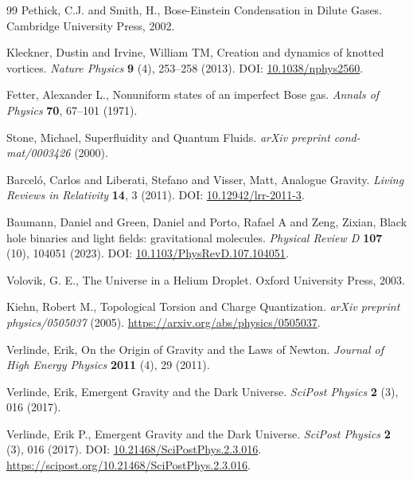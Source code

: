 \documentclass[12pt]{article}
\begin{document}
\begin{thebibliography}{99}
Pethick, C.J. and Smith, H.,
\newblock Bose-Einstein Condensation in Dilute Gases.
\newblock Cambridge University Press, 2002.


Kleckner, Dustin and Irvine, William TM,
\newblock Creation and dynamics of knotted vortices.
\textit{Nature Physics} \textbf{9} (4), 253--258 (2013).
\newblock DOI: \href{https://doi.org/10.1038/nphys2560}{10.1038/nphys2560}.


Fetter, Alexander L.,
\newblock Nonuniform states of an imperfect Bose gas.
\textit{Annals of Physics} \textbf{70}, 67--101 (1971).


Stone, Michael,
\newblock Superfluidity and Quantum Fluids.
\textit{arXiv preprint cond-mat/0003426} (2000).


Barceló, Carlos and Liberati, Stefano and Visser, Matt,
\newblock Analogue Gravity.
\textit{Living Reviews in Relativity} \textbf{14}, 3 (2011).
\newblock DOI: \href{https://doi.org/10.12942/lrr-2011-3}{10.12942/lrr-2011-3}.


Baumann, Daniel and Green, Daniel and Porto, Rafael A and Zeng, Zixian,
\newblock Black hole binaries and light fields: gravitational molecules.
\textit{Physical Review D} \textbf{107} (10), 104051 (2023).
\newblock DOI: \href{https://doi.org/10.1103/PhysRevD.107.104051}{10.1103/PhysRevD.107.104051}.


Volovik, G. E.,
\newblock The Universe in a Helium Droplet.
\newblock Oxford University Press, 2003.


Kiehn, Robert M.,
\newblock Topological Torsion and Charge Quantization.
\textit{arXiv preprint physics/0505037} (2005).
\newblock \url{https://arxiv.org/abs/physics/0505037}.


Verlinde, Erik,
\newblock On the Origin of Gravity and the Laws of Newton.
\textit{Journal of High Energy Physics} \textbf{2011} (4), 29 (2011).


Verlinde, Erik,
\newblock Emergent Gravity and the Dark Universe.
\textit{SciPost Physics} \textbf{2} (3), 016 (2017).


Verlinde, Erik P.,
\newblock Emergent Gravity and the Dark Universe.
\textit{SciPost Physics} \textbf{2} (3), 016 (2017).
\newblock DOI: \href{https://doi.org/10.21468/SciPostPhys.2.3.016}{10.21468/SciPostPhys.2.3.016}.
\newblock \url{https://scipost.org/10.21468/SciPostPhys.2.3.016}.



\end{thebibliography}
\end{document}
